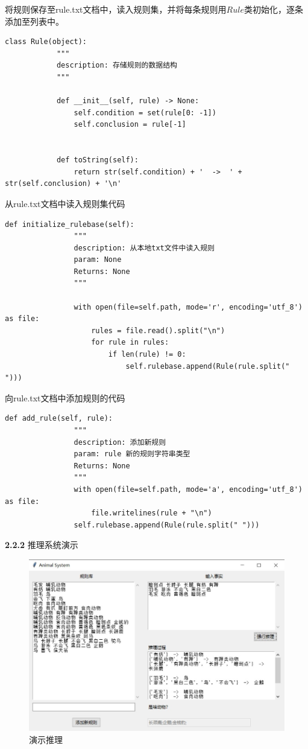 \documentclass[a4paper]{article}   %
\begin{document}
 	将规则保存至rule.txt文档中，读入规则集，并将每条规则用$ Rule $类初始化，逐条添加至列表中。\par 
 	\begin{lstlisting}[style=Python]
 		class Rule(object):
 		    """
 		    description: 存储规则的数据结构
 		    """
 		
 		    def __init__(self, rule) -> None:
 		        self.condition = set(rule[0: -1])
 		        self.conclusion = rule[-1]
 		
 		    
 		    def toString(self):
 		        return str(self.condition) + '  ->  ' + str(self.conclusion) + '\n'
 	\end{lstlisting}
 	从rule.txt文档中读入规则集代码\par 
 	\begin{lstlisting}[style=Python]
 		    def initialize_rulebase(self):
 		        """
 		        description: 从本地txt文件中读入规则
 		        param: None
 		        Returns: None
 		        """
 		
 		        with open(file=self.path, mode='r', encoding='utf_8') as file:
 		            rules = file.read().split("\n")
 		            for rule in rules:
 		                if len(rule) != 0:
 		                    self.rulebase.append(Rule(rule.split(" ")))
 	\end{lstlisting}
 	向rule.txt文档中添加规则的代码\par 
 	\begin{lstlisting}[style=Python]
 		    def add_rule(self, rule):
 		        """
 		        description: 添加新规则
 		        param: rule 新的规则字符串类型
 		        Returns: None
 		        """
 		        with open(file=self.path, mode='a', encoding='utf_8') as file:
 		            file.writelines(rule + "\n")
 		        self.rulebase.append(Rule(rule.split(" ")))
 	\end{lstlisting}
 	\newpage
 	\noindent
 	\textbf{2.2.2} 推理系统演示 \par 
 	\begin{figure}[!htbp]
 		\centering
 		\includegraphics[scale=0.75]{./resource/show1.jpg}
 		\caption{演示推理}
 	\end{figure}
\end{document}
